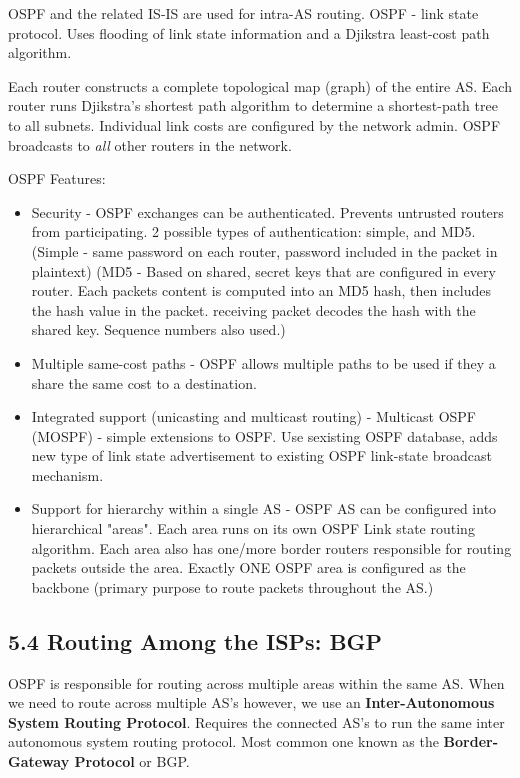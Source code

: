 \documentclass[11pt]{article}
\begin{document}
OSPF and the related IS-IS are used for intra-AS routing.
OSPF - link state protocol. Uses flooding of link state information and a Djikstra least-cost path algorithm.

Each router constructs a complete topological map (graph) of the entire AS. Each router runs Djikstra's shortest path algorithm to determine a shortest-path tree to all subnets. Individual link costs are configured by the network admin. OSPF broadcasts to \emph{all} other routers in the network.

OSPF Features:
\begin{itemize}
\item Security - OSPF exchanges can be authenticated. Prevents untrusted routers from participating. 2 possible types of authentication: simple, and MD5. (Simple - same password on each router, password included in the packet in plaintext) (MD5 - Based on shared, secret keys that are configured in every router. Each packets content is computed into an MD5 hash, then includes the hash value in the packet. receiving packet decodes the hash with the shared key. Sequence numbers also used.)
\item Multiple same-cost paths - OSPF allows multiple paths to be used if they a share the same cost to a destination.
\item Integrated support (unicasting and multicast routing) - Multicast OSPF (MOSPF) - simple extensions to OSPF. Use sexisting OSPF database, adds new type of link state advertisement to existing OSPF link-state broadcast mechanism.
\item Support for hierarchy within a single AS - OSPF AS can be configured into hierarchical "areas". Each area runs on its own OSPF Link state routing algorithm. Each area also has one/more border routers responsible for routing packets outside the area. Exactly ONE OSPF area is configured as the backbone (primary purpose to route packets throughout the AS.)
\end{itemize}

\subsection{5.4 Routing Among the ISPs: BGP}
\label{sec:orgd0b40ec}
OSPF is responsible for routing across multiple areas within the same AS.
When we need to route across multiple AS's however, we use an \textbf{Inter-Autonomous System Routing Protocol}.
Requires the connected AS's to run the same inter autonomous system routing protocol.
Most common one known as the \textbf{Border-Gateway Protocol} or BGP.
\end{document}
